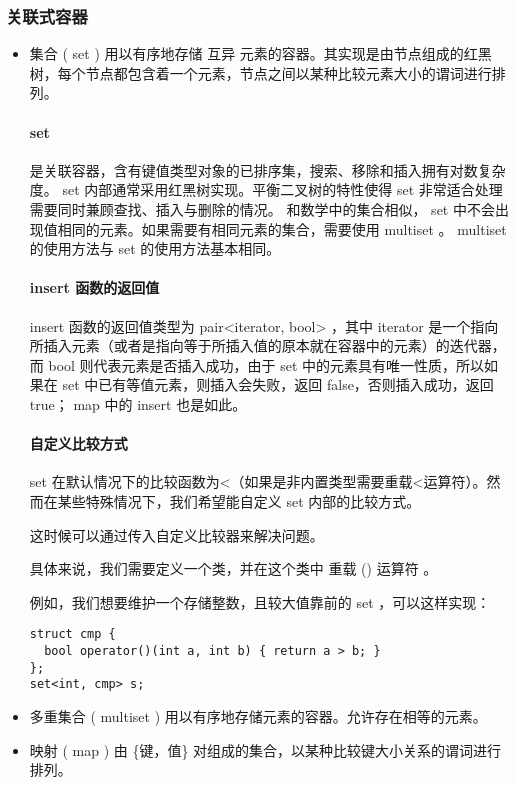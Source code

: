 \documentclass[UTF8]{ctexart}
\begin{document}
\subsubsection{关联式容器}
\begin{itemize}
\item 集合 ( set ) 用以有序地存储 互异 元素的容器。其实现是由节点组成的红黑树，每个节点都包含着一个元素，节点之间以某种比较元素大小的谓词进行排列。
\paragraph{set}
是关联容器，含有键值类型对象的已排序集，搜索、移除和插入拥有对数复杂度。 set 内部通常采用红黑树实现。平衡二叉树的特性使得 set 非常适合处理需要同时兼顾查找、插入与删除的情况。
和数学中的集合相似， set 中不会出现值相同的元素。如果需要有相同元素的集合，需要使用 multiset 。 multiset 的使用方法与 set 的使用方法基本相同。
\paragraph{insert 函数的返回值}
insert 函数的返回值类型为 pair<iterator, bool> ，其中 iterator 是一个指向所插入元素（或者是指向等于所插入值的原本就在容器中的元素）的迭代器，而 bool 则代表元素是否插入成功，由于 set 中的元素具有唯一性质，所以如果在 set 中已有等值元素，则插入会失败，返回 false，否则插入成功，返回 true； map 中的 insert 也是如此。
\paragraph{自定义比较方式}
set 在默认情况下的比较函数为<（如果是非内置类型需要重载<运算符）。然而在某些特殊情况下，我们希望能自定义 set 内部的比较方式。


这时候可以通过传入自定义比较器来解决问题。


具体来说，我们需要定义一个类，并在这个类中 重载 () 运算符 。


例如，我们想要维护一个存储整数，且较大值靠前的 set ，可以这样实现：
\begin{lstlisting}
struct cmp {
  bool operator()(int a, int b) { return a > b; }
};
set<int, cmp> s;
\end{lstlisting}
\item 多重集合 ( multiset ) 用以有序地存储元素的容器。允许存在相等的元素。
\item 映射 ( map ) 由 \{键，值\} 对组成的集合，以某种比较键大小关系的谓词进行排列。



\end{itemize}
\end{document}
